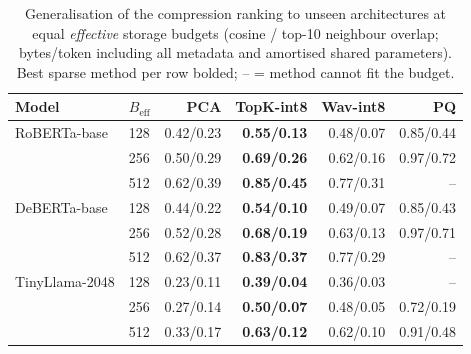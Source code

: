 \begin{table}[t]
\centering
\caption{Generalisation of the compression ranking to unseen
architectures at equal \emph{effective} storage budgets
(cosine / top-10 neighbour overlap; bytes/token including all
metadata and amortised shared parameters). Best sparse method
per row bolded; -- = method cannot fit the budget.}
\label{tab:gen}
\begin{tabular}{llrrrr}
\toprule
Model & $B_{\mathrm{eff}}$ & PCA & TopK-int8 & Wav-int8 & PQ \\
\midrule
RoBERTa-base & 128 & 0.42/0.23 & \textbf{0.55/0.13} & 0.48/0.07 & 0.85/0.44 \\
 & 256 & 0.50/0.29 & \textbf{0.69/0.26} & 0.62/0.16 & 0.97/0.72 \\
 & 512 & 0.62/0.39 & \textbf{0.85/0.45} & 0.77/0.31 & -- \\
\midrule
DeBERTa-base & 128 & 0.44/0.22 & \textbf{0.54/0.10} & 0.49/0.07 & 0.85/0.43 \\
 & 256 & 0.52/0.28 & \textbf{0.68/0.19} & 0.63/0.13 & 0.97/0.71 \\
 & 512 & 0.62/0.37 & \textbf{0.83/0.37} & 0.77/0.29 & -- \\
\midrule
TinyLlama-2048 & 128 & 0.23/0.11 & \textbf{0.39/0.04} & 0.36/0.03 & -- \\
 & 256 & 0.27/0.14 & \textbf{0.50/0.07} & 0.48/0.05 & 0.72/0.19 \\
 & 512 & 0.33/0.17 & \textbf{0.63/0.12} & 0.62/0.10 & 0.91/0.48 \\
\bottomrule
\end{tabular}
\end{table}
